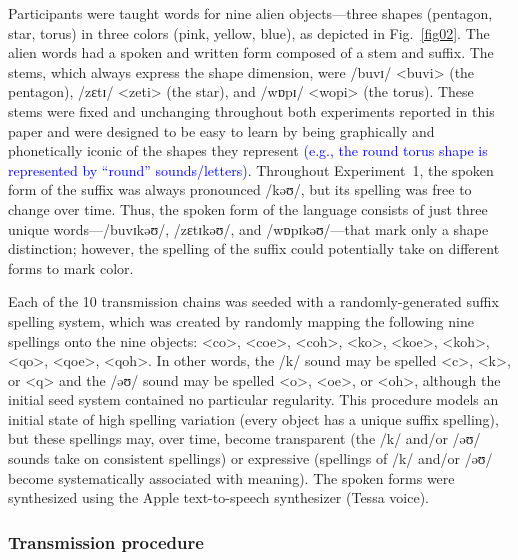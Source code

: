 \documentclass[doc,biblatex]{apa7}
\newcommand\newmaterial[1]{\textcolor{blue}{#1}}
\begin{document}
Participants were taught words for nine alien objects---three shapes (pentagon, star, torus) in three colors (pink, yellow, blue), as depicted in Fig.~\ref{fig02}. The alien words had a spoken and written form composed of a stem and suffix. The stems, which always express the shape dimension, were /buvɪ/ <buvi> (the pentagon), /zɛtɪ/ <zeti> (the star), and /wɒpɪ/ <wopi> (the torus). These stems were fixed and unchanging throughout both experiments reported in this paper and were designed to be easy to learn by being graphically and phonetically iconic of the shapes they represent \newmaterial{(e.g., the round torus shape is represented by ``round'' sounds/letters)}. Throughout Experiment~1, the spoken form of the suffix was always pronounced /kəʊ/, but its spelling was free to change over time. Thus, the spoken form of the language consists of just three unique words---/buvɪkəʊ/, /zɛtɪkəʊ/, and /wɒpɪkəʊ/---that mark only a shape distinction; however, the spelling of the suffix could potentially take on different forms to mark color.

Each of the 10 transmission chains was seeded with a randomly-generated suffix spelling system, which was created by randomly mapping the following nine spellings onto the nine objects: <co>, <coe>, <coh>, <ko>, <koe>, <koh>, <qo>, <qoe>, <qoh>. In other words, the /k/ sound may be spelled <c>, <k>, or <q> and the /əʊ/ sound may be spelled <o>, <oe>, or <oh>, although the initial seed system contained no particular regularity. This procedure models an initial state of high spelling variation (every object has a unique suffix spelling), but these spellings may, over time, become transparent (the /k/ and/or /əʊ/ sounds take on consistent spellings) or expressive (spellings of /k/ and/or /əʊ/ become systematically associated with meaning). The spoken forms were synthesized using the Apple text-to-speech synthesizer (Tessa voice).

\subsubsection{Transmission procedure}
\end{document}
